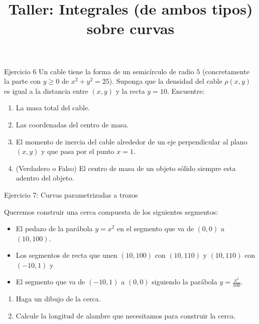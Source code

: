 \documentclass[usepdftitle=false]{beamer}
\title[]{Taller: Integrales (de ambos tipos) sobre curvas}
\date{}
\begin{document}
\begin{frame}
  \titlepage
\end{frame}

\begin{frame}{Ejercicio 6}
Un cable tiene la forma de un semic\'irculo de radio $5$ (concretamente la parte con $y\geq 0$ de $x^2+y^2=25$). Suponga que la densidad del cable $\rho(x,y)$ es igual a la distancia entre $(x,y)$ y la recta $y=10$. Encuentre:

\begin{enumerate}
\item La masa total del cable.
\item Las coordenadas del centro de masa.
\item El momento de inercia del cable alrededor de un eje perpendicular al plano $(x,y)$ y que pasa por el punto $x=1$.
\item (Verdadero o Falso) El centro de masa de un objeto s\'olido siempre esta adentro del objeto.

\end{enumerate}

\end{frame}

\begin{frame}{Ejercicio 7: Curvas parametrizadas a trozos}

Queremos construir una cerca compuesta de los siguientes segmentos: 

\begin{itemize}
\item El pedazo de la par\'abola $y=x^2$ en el segmento que va de $(0,0)$ a $(10,100)$.
\item Los segmentos de recta que unen  $(10,100)$ con $(10,110)$ y $(10,110)$ con $(-10,1)$ y
\item El segmento que va de $(-10,1)$ a $(0,0)$ siguiendo la par\'abola $y=\frac{x^2}{100}$.
\end{itemize}

\begin{enumerate}
\item Haga un dibujo de la cerca.
\item Calcule la longitud de alambre que necesitamos para construir la cerca.
\end{enumerate}



\end{frame}
\end{document}
